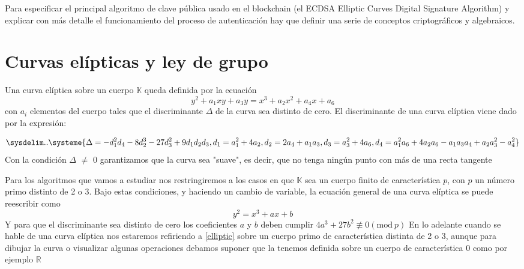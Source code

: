 Para especificar el principal algoritmo de clave pública usado en el blockchain (el ECDSA Elliptic Curves Digital Signature Algorithm) y explicar con más detalle el funcionamiento del proceso de autenticación hay que definir una serie de conceptos criptográficos y algebraicos. 
\section{Curvas elípticas y ley de grupo}\label{curvas_grupo}
\theoremstyle{definition}\begin{definition}\label{curv_ellipt}
Una curva elíptica sobre un cuerpo $\mathbb{K}$ queda definida por la ecuación \[y^2 +a_1xy+a_3 y = x^3 +a_2x^2 +a_4x +a_6\] con $a_i$ elementos del cuerpo tales que el discriminante $\Delta$ de la curva sea distinto de cero.
El discriminante de una curva elíptica viene dado por la expresión:

\begin{equation*}
  \sysdelim..\systeme{
  \Delta = -d_1^2d_4 - 8d_2^3 - 27d_3^2 + 9d_1d_2d_3,
  d_1 = a_1^2 + 4a_2,
  d_2 = 2a_4 + a_1a_3,
  d_3 = a_3^2 + 4a_6,
  d_4 = a_1^2a_6 + 4a_2a_6 - a_1a_3a_4 + a_2a_3^2 - a_4^2
  }
\end{equation*}
Con la condición $\Delta$ $\neq$ 0 garantizamos que la curva sea "suave", es decir, que no tenga ningún punto con más de una recta tangente
\end{definition} Para los algoritmos que vamos a estudiar nos restringiremos a los casos en que $\mathbb{K}$ sea un cuerpo finito de característica $p$, con $p$ un número primo distinto de 2 o 3. Bajo estas condiciones, y haciendo un cambio de variable, la ecuación general de una curva elíptica se puede reescribir como \begin{equation} \label{elliptic}y^2 = x^3 + ax + b \end{equation} Y para que el discriminante sea distinto de cero los coeficientes $a$ y $b$ deben cumplir $4a^3 + 27b^2 \not\equiv 0(\textrm{mod}\ p)$ En lo adelante cuando se hable de una curva elíptica nos estaremos refiriendo a \ref{elliptic} sobre un cuerpo primo de característica distinta de 2 o 3, aunque para dibujar la curva o visualizar algunas operaciones debamos suponer que la tenemos definida sobre un cuerpo de característica 0 como por ejemplo $\mathbb{R}$

